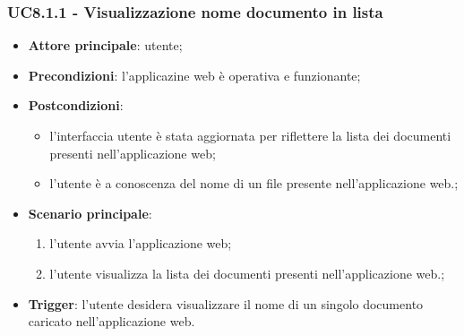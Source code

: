 \documentclass[10pt, a4paper]{article}
\begin{document}
    \subsubsection{UC8.1.1 - Visualizzazione nome documento in lista}
    \begin{itemize}
        \item \textbf{Attore principale}: utente;
        \item \textbf{Precondizioni}: l'applicazine web è operativa e funzionante;
        \item \textbf{Postcondizioni}:
        \begin{itemize}
            \item l'interfaccia utente è stata aggiornata per riflettere la lista dei documenti presenti nell'applicazione web;
            \item l'utente è a conoscenza del nome di un file presente nell'applicazione web.;
        \end{itemize}
        \item \textbf{Scenario principale}:
        \begin{enumerate}
            \item l'utente avvia l'applicazione web;
            \item l'utente visualizza la lista dei documenti presenti nell'applicazione web.;
        \end{enumerate}
        \item \textbf{Trigger}: l'utente desidera visualizzare il nome di un singolo documento caricato nell'applicazione web.
    \end{itemize}
\end{document}

